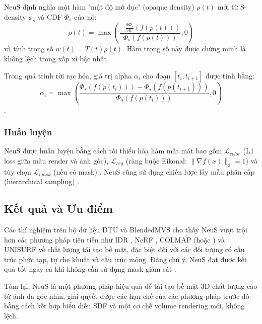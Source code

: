 NeuS định nghĩa một hàm "mật độ mờ đục" (opaque density) $\rho(t)$ mới từ S-density $\phi_s$ và CDF $\Phi_s$ của nó:
$$\rho(t) = \max\left(\frac{-\frac{d\Phi_s}{dt}(f(p(t)))}{\Phi_s(f(p(t)))}, 0\right)$$
và tính trọng số $w(t) = T(t)\rho(t)$. Hàm trọng số này được chứng minh là không lệch trong xấp xỉ bậc nhất \cite{Wang2021NeuS}. %

Trong quá trình rời rạc hóa, giá trị alpha $\alpha_i$ cho đoạn $[t_i, t_{i+1}]$ được tính bằng:
$$\alpha_i = \max\left(\frac{\Phi_s(f(p(t_i))) - \Phi_s(f(p(t_{i+1})))}{\Phi_s(f(p(t_i)))}, 0\right)$$
\cite{Wang2021NeuS}. %

\subsubsection{Huấn luyện}
NeuS được huấn luyện bằng cách tối thiểu hóa hàm mất mát bao gồm $\mathcal{L}_{color}$ (L1 loss giữa màu render và ảnh gốc), $\mathcal{L}_{reg}$ (ràng buộc Eikonal: $\|\nabla f(x)\|_2 = 1$) và tùy chọn $\mathcal{L}_{mask}$ (nếu có mask) \cite{Wang2021NeuS}. %
NeuS cũng sử dụng chiến lược lấy mẫu phân cấp (hierarchical sampling) \cite{Wang2021NeuS}. %

\subsection{Kết quả và Ưu điểm}
Các thí nghiệm trên bộ dữ liệu DTU \cite{Jensen2014DTU} và BlendedMVS \cite{Yao2020BlendedMVS} cho thấy NeuS vượt trội hơn các phương pháp tiên tiến như IDR \cite{Yariv2020IDR}, NeRF \cite{Mildenhall2020NeRF}, COLMAP \cite{Schonberger16SFMRevisited} (hoặc \cite{Schoenberger2016Pixelwise}) và UNISURF \cite{Oechsle2021UNISURF} về chất lượng tái tạo bề mặt, đặc biệt đối với các đối tượng có cấu trúc phức tạp, tự che khuất và cấu trúc mỏng. Đáng chú ý, NeuS đạt được kết quả tốt ngay cả khi không cần sử dụng mask giám sát \cite{Wang2021NeuS}. %

Tóm lại, NeuS là một phương pháp hiệu quả để tái tạo bề mặt 3D chất lượng cao từ ảnh đa góc nhìn, giải quyết được các hạn chế của các phương pháp trước đó bằng cách kết hợp biểu diễn SDF và một cơ chế volume rendering mới, không lệch.


